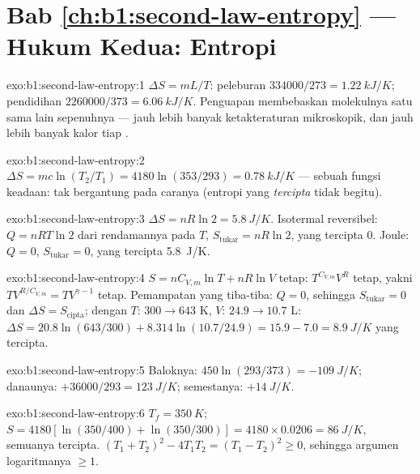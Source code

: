 \section*{Bab \ref{ch:b1:second-law-entropy} --- Hukum Kedua: Entropi}

\begin{solution}{exo:b1:second-law-entropy:1}
$\Delta S = mL/T$: peleburan $334000/273 = \qty{1.22}{kJ/K}$; pendidihan $2260000/
373 = \qty{6.06}{kJ/K}$. Penguapan membebaskan molekulnya satu sama lain
sepenuhnya --- jauh lebih banyak ketakteraturan mikroskopik, dan jauh lebih banyak kalor tiap
.
\end{solution}

\begin{solution}{exo:b1:second-law-entropy:2}
$\Delta S = mc\ln(T_2/T_1) = 4180\ln(353/293) = \qty{0.78}{kJ/K}$ --- sebuah fungsi
keadaan: tak bergantung pada caranya (entropi yang \emph{tercipta} tidak begitu).
\end{solution}

\begin{solution}{exo:b1:second-law-entropy:3}
$\Delta S = nR\ln2 = \qty{5.8}{J/K}$. Isotermal reversibel: $Q = nRT\ln2$
dari rendamannya pada $T$, $S_{\mathrm{tukar}} = nR\ln2$, yang tercipta $0$. Joule:
$Q = 0$, $S_{\mathrm{tukar}} = 0$, yang tercipta \qty{5.8}{J/K}.
\end{solution}

\begin{solution}{exo:b1:second-law-entropy:4}
$S = nC_{V,m}\ln T + nR\ln V$ tetap: $T^{C_{V,m}}V^R$ tetap, yakni
$TV^{R/C_{V,m}} = TV^{\gamma - 1}$ tetap. Pemampatan yang tiba-tiba: $Q = 0$, sehingga
$S_{\mathrm{tukar}} = 0$ dan $\Delta S = S_{\mathrm{cipta}}$; dengan $T$: $300 \to
643$ K, $V$: $24.9 \to 10.7$ L: $\Delta S = 20.8\ln(643/300) + 8.314\ln(10.7/
24.9) = 15.9 - 7.0 = \qty{+8.9}{J/K}$ yang tercipta.
\end{solution}

\begin{solution}{exo:b1:second-law-entropy:5}
Baloknya: $450\ln(293/373) = \qty{-109}{J/K}$; danaunya: $+36000/293 = \qty{+123}{J/K}$;
semestanya: $+\qty{14}{J/K}$.
\end{solution}

\begin{solution}{exo:b1:second-law-entropy:6}
$T_f = \qty{350}{K}$; $S = 4180[\ln(350/400) + \ln(350/300)] = 4180 \times
0.0206 = \qty{86}{J/K}$, semuanya tercipta. $(T_1 + T_2)^2 - 4T_1T_2 = (T_1 - T_2)^2
\geq 0$, sehingga argumen logaritmanya $\geq 1$.
\end{solution}

